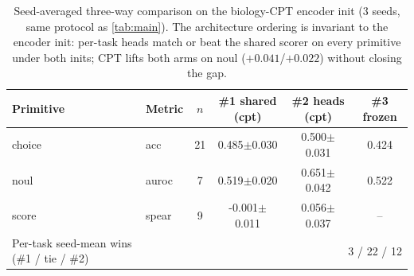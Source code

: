 \begin{table}[t]
\centering
\caption{Seed-averaged three-way comparison on the biology-CPT encoder init (3 seeds, same protocol as \cref{tab:main}). The architecture ordering is invariant to the encoder init: per-task heads match or beat the shared scorer on every primitive under both inits; CPT lifts both arms on noul ($+0.041$/$+0.022$) without closing the gap.}
\label{tab:main_cpt}
\footnotesize\setlength{\tabcolsep}{3pt}
\begin{tabular}{llcccc}
\toprule
Primitive & Metric & $n$ & \#1 shared (cpt) & \#2 heads (cpt) & \#3 frozen \\
\midrule
choice & acc & 21 & 0.485$\pm$0.030 & 0.500$\pm$0.031 & 0.424 \\
noul & auroc & 7 & 0.519$\pm$0.020 & 0.651$\pm$0.042 & 0.522 \\
score & spear & 9 & -0.001$\pm$0.011 & 0.056$\pm$0.037 & -- \\
\addlinespace
Per-task seed-mean wins (\#1 / tie / \#2) & & & \multicolumn{3}{r}{3 / 22 / 12} \\
\bottomrule
\end{tabular}
\end{table}
